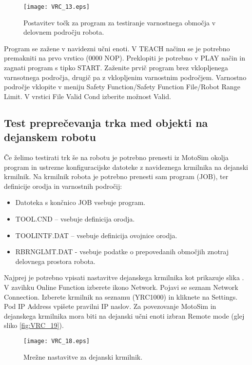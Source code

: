 \begin{figure}[hbt]
	\centering
	\texttt{[image: VRC\_13.eps]}
	\caption{Postavitev točk za program za testiranje varnostnega območja v delovnem področju robota.}
	\label{fig:VRC_13}
\end{figure}

Program se zažene v navidezni učni enoti. V TEACH načinu se je potrebno premakniti na prvo vrstico (0000 NOP). Preklopiti je potrebno v PLAY način in zagnati program s tipko START. Zaženite prvič program brez vklopljenega varnsotnega področja, drugič pa z vklopljenim varnostnim področjem. Varnostno področje vklopite v meniju Safety Function/Safety Function File/Robot Range Limit. V vrstici File Valid Cond izberite možnost Valid.

\subsection*{Test preprečevanja trka med objekti na dejanskem robotu}

Če želimo testirati trk še na robotu je potrebno prenesti iz MotoSim okolja program in ustrezne konfiguracijske datoteke z navideznega krmilnika na dejanski krmilnik. Na krmilnik robota je potrebno prenesti sam program (JOB), ter definicije orodja in varnostnih področij:
\begin{itemize}
\item Datoteka s končnico JOB vsebuje program.
\item TOOL.CND – vsebuje definicija orodja.
\item TOOLINTF.DAT – vsebuje definicija ovojnice orodja.
\item RBRNGLMT.DAT - vsebuje podatke o prepovedanih območjih znotraj delovnega prostora robota.
\end{itemize}

Najprej je potrebno vpisati nastavitve dejanskega krmilnika kot prikazuje slika . V zavihku Online Function izberete ikono Network. Pojavi se seznam Network Connection. Izberete krmilnik na seznamu (YRC1000) in kliknete na Settings. Pod IP Address vpišete pravilni IP naslov. Za povezovanje MotoSim in dejanskega krmilnika mora biti na dejanski učni enoti izbran Remote mode (glej sliko \ref{fig:VRC_19}).

\begin{figure}[hbt]
	\centering
	\texttt{[image: VRC\_18.eps]}
	\caption{Mrežne nastavitve za dejanski krmilnik.}
	\label{fig:VRC_18}
\end{figure}

